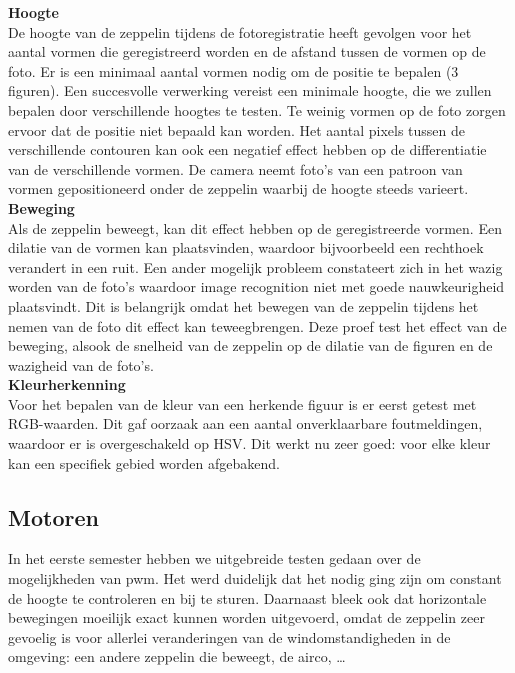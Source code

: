 \documentclass[eind]{penoverslag}
\begin{document}
\textbf{Hoogte}\\
De hoogte van de zeppelin tijdens de fotoregistratie heeft gevolgen voor het aantal vormen die geregistreerd worden en de afstand tussen de vormen op de foto. Er is een minimaal aantal vormen nodig om de positie te bepalen (3 figuren). Een succesvolle verwerking vereist een minimale hoogte, die we zullen bepalen door verschillende hoogtes te testen. Te weinig vormen op de foto zorgen ervoor dat de positie niet bepaald kan worden. Het aantal pixels tussen de verschillende contouren kan ook een negatief effect hebben op de differentiatie van de verschillende vormen. De camera neemt foto’s van een patroon van vormen gepositioneerd onder de zeppelin waarbij de hoogte steeds varieert.\\ 

\textbf{Beweging}\\
Als de zeppelin beweegt, kan dit effect hebben op de geregistreerde vormen. Een dilatie van de vormen kan plaatsvinden, waardoor bijvoorbeeld een rechthoek verandert in een ruit. Een ander mogelijk probleem constateert zich in het wazig worden van de foto’s waardoor image recognition niet met goede nauwkeurigheid plaatsvindt. Dit is belangrijk omdat het bewegen van de zeppelin tijdens het nemen van de foto dit effect kan teweegbrengen. Deze proef test het effect van de beweging, alsook de snelheid van de zeppelin op de dilatie van de figuren en de wazigheid van de foto’s.  \\

\textbf{Kleurherkenning}\\
Voor het bepalen van de kleur van een herkende figuur is er eerst getest met RGB-waarden. Dit gaf oorzaak aan een aantal onverklaarbare foutmeldingen, waardoor er is overgeschakeld op HSV. Dit werkt nu zeer goed: voor elke kleur kan een specifiek gebied worden afgebakend. \\

\subsection{Motoren}
In het eerste semester hebben we uitgebreide testen gedaan over de mogelijkheden van pwm. Het werd duidelijk dat het nodig ging zijn om constant de hoogte te controleren en bij te sturen. Daarnaast bleek ook dat horizontale bewegingen moeilijk exact kunnen worden uitgevoerd, omdat de zeppelin zeer gevoelig is voor allerlei veranderingen van de windomstandigheden in de omgeving: een andere zeppelin die beweegt, de airco, \ldots \\
\end{document}
